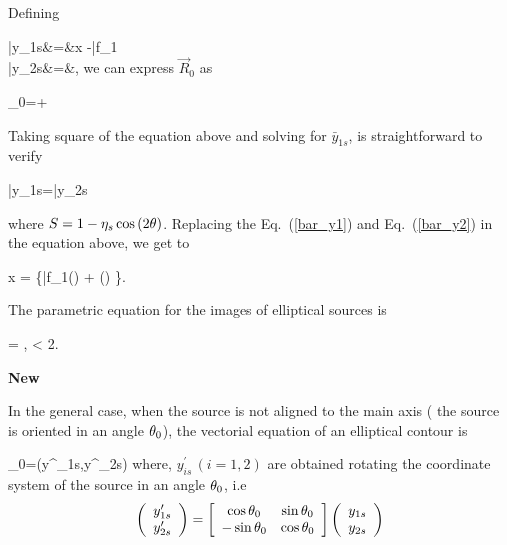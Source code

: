 Defining

\bea
\bar{y}_{1s}&=&\kt x -\bar{f}_1\label{bar_y1}\\
\bar{y}_{2s}&=&,\label{bar_y2}
\eea
we can express $\vec{R}_0$ as

\beq
{}_0=\hat{\imath}+\hat{\jmath}
\eeq

Taking square of the equation above and solving for $\bar{y}_{1s}$, is straightforward to verify

\beq
\bar{y}_{1s}=\bar{y}_{2s}\pm {}
\eeq

where $S=1-\eta_s\cos{(2\theta)}$. Replacing the Eq.~(\ref{bar_y1}) and Eq.~(\ref{bar_y2}) in the equation above, we get to

\beq
x =  \left\{\bar{f}_{1}(\theta) + \left(\right) \pm {}  \right\}.
\label{elliptical_contour}
\eeq

The parametric equation for the images of elliptical sources is

\beq
{}= ,  \leq \te < 2\pi.
\eeq

{\bf New}

In the general case, when the source is not aligned to the main axis ( the source is oriented in an angle
$\theta_0$), the vectorial equation of an elliptical contour is

\beq
\label{eq:ellipsetheta}
_0=\left(y^\prime_{1s},y^\prime_{2s}\right)
\eeq
where, $y^\prime_{is}\, (i=1,2)$ are obtained rotating the coordinate system of the source in an angle $\theta_0$,
i.e
\begin{equation}
\left(\begin{array}{c}y^\prime_{1s} \\ y^\prime_{2s} \end{array}\right)=\left[\begin{array}{c c}%
\cos{\te_0} & \sin{\te_0}\\ -\sin{\te_0} & \cos{\te_0} \end{array} \right]\left( \begin{array}{c} y_{1s}\\ y_{2s}\end{array}\right)
\end{equation}

